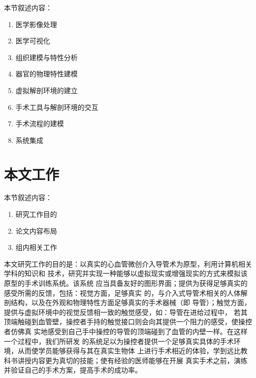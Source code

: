 本节叙述内容：
\begin{enumerate}
  \item 医学影像处理
  \item 医学可视化
  \item 组织建模与特性分析
  \item 器官的物理特性建模
  \item 虚拟解剖环境的建立
  \item 手术工具与解剖环境的交互
  \item 手术流程的建模
  \item 系统集成
\end{enumerate}

\section{本文工作}

本节叙述内容：
\begin{enumerate}
  \item 研究工作目的
  \item 论文内容布局
  \item 组内相关工作
\end{enumerate}

本文研究工作的目的是：以真实的心血管微创介入导管术为原型，利用计算机相关学科的知识和
技术，研究并实现一种能够以虚拟现实或增强现实的方式来模拟该原型的手术训练系统。该系统
应当具备友好的图形界面；提供为获得足够真实的感受所需的反馈，包括：视觉方面，足够真实
的，与介入式导管术相关的人体解剖结构，以及在外观和物理特性方面足够真实的手术器械（即
导管）；触觉方面，提供与虚拟环境中的视觉反馈相一致的触觉感受，如：导管在进给过程中，
若其顶端触碰到血管壁，操控者手持的触觉接口则会向其提供一个阻力的感受，使操控者仿佛真
实地感受到自己手中操控的导管的顶端碰到了血管的内壁一样。在这样一个过程中，我们所研发
的系统足以为操控者提供一个足够真实具体的手术环境，从而使学员能够获得与其在真实生物体
上进行手术相近的体验，学到远比教科书讲授内容更为真切的技能；使有经验的医师能够在开展
真实手术之前，演练并验证自己的手术方案，提高手术的成功率。

